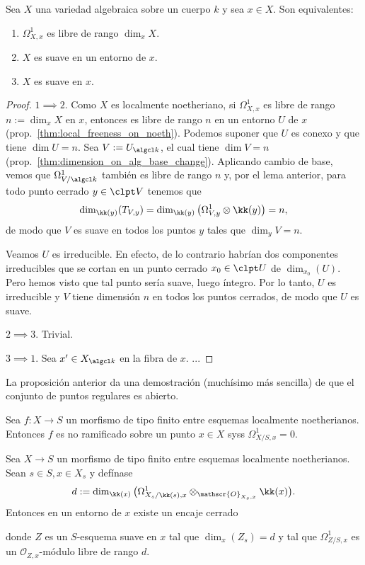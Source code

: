 \begin{prop}
	Sea $X$ una variedad algebraica sobre un cuerpo $k$ y sea $x \in X$.
	Son equivalentes:
	\begin{enumerate}
		\item $\Omega_{X, x}^1$ es libre de rango $\dim_x X$.
		\item $X$ es suave en un entorno de $x$.
		\item $X$ es suave en $x$.
	\end{enumerate}
\end{prop}
\begin{proof}
	$1 \implies 2$.
	Como $X$ es localmente noetheriano, si $\Omega_{X, x}^1$ es libre de rango $n := \dim_x X$ en $x$,
	entonces es libre de rango $n$ en un entorno $U$ de $x$ (prop.~\ref{thm:local_freeness_on_noeth}).
	Podemos suponer que $U$ es conexo y que tiene $\dim U = n$.
	Sea $V := U_{\algcl k}$, el cual tiene $\dim V = n$ (prop.~\ref{thm:dimension_on_alg_base_change}).
	Aplicando cambio de base, vemos que $\Omega_{V/\algcl k}^1$ también es libre de rango $n$ y, por el lema anterior,
	para todo punto cerrado $y \in \clpt V$ tenemos que
	$$ \dim_{\kk(y)}( T_{V, y} ) = \dim_{\kk(y)}\big( \Omega_{V, y}^1 \otimes \kk(y) \big) = n, $$
	de modo que $V$ es suave en todos los puntos $y$ tales que $\dim_y V = n$.

	Veamos $U$ es irreducible. En efecto, de lo contrario habrían dos componentes irreducibles que se cortan en un punto cerrado $x_0 \in \clpt U$
	de $\dim_{x_0}(U)$.
	Pero hemos visto que tal punto sería suave, luego íntegro.
	Por lo tanto, $U$ es irreducible y $V$ tiene dimensión $n$ en todos los puntos cerrados, de modo que $U$ es suave.

	$2 \implies 3$. Trivial.

	$3 \implies 1$. Sea $x' \in X_{\algcl k}$ en la fibra de $x$.
	...
\end{proof}
La proposición anterior da una demostración (muchísimo más sencilla) de que el conjunto de puntos regulares es abierto.

\begin{cor}\label{thm:unram_omega_criteria}
	Sea $f \colon X \to S$ un morfismo de tipo finito entre esquemas localmente noetherianos.
	Entonces $f$ es no ramificado sobre un punto $x \in X$ syss $\Omega_{X/S, x}^1 = 0$.
\end{cor}

\begin{lem}
	Sea $X \to S$ un morfismo de tipo finito entre esquemas localmente noetherianos.
	Sean $s \in S, x \in X_s$ y defínase
	\[
		d := \dim_{\kk(x)}\big( \Omega_{X_s/\kk(s), x}^1 \otimes_{\mathscr{O}_{X_s, x}} \kk(x) \big).
	\]
	Entonces en un entorno de $x$ existe un encaje cerrado 
	donde $Z$ es un $S$-esquema suave en $x$ tal que $\dim_x(Z_s) = d$ y tal que $ \Omega_{Z/S, x}^1 $ es un $\mathscr{O}_{Z, x}$-módulo libre
	de rango $d$.
\end{lem}

